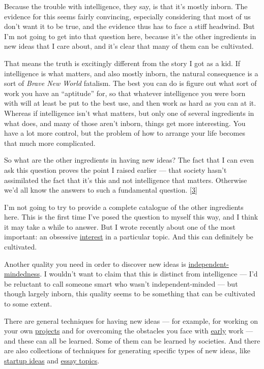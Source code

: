 Because the trouble with intelligence, they say, is that it's mostly
inborn. The evidence for this seems fairly convincing, especially
considering that most of us don't want it to be true, and the evidence
thus has to face a stiff headwind. But I'm not going to get into that
question here, because it's the other ingredients in new ideas that I
care about, and it's clear that many of them can be cultivated.

That means the truth is excitingly different from the story I got as a
kid. If intelligence is what matters, and also mostly inborn, the
natural consequence is a sort of \emph{Brave New World} fatalism. The
best you can do is figure out what sort of work you have an ``aptitude''
for, so that whatever intelligence you were born with will at least be
put to the best use, and then work as hard as you can at it. Whereas if
intelligence isn't what matters, but only one of several ingredients in
what does, and many of those aren't inborn, things get more interesting.
You have a lot more control, but the problem of how to arrange your life
becomes that much more complicated.

So what are the other ingredients in having new ideas? The fact that I
can even ask this question proves the point I raised earlier --- that
society hasn't assimilated the fact that it's this and not intelligence
that matters. Otherwise we'd all know the answers to such a fundamental
question. {[}\hyperref[f3n]{3}{]}

I'm not going to try to provide a complete catalogue of the other
ingredients here. This is the first time I've posed the question to
myself this way, and I think it may take a while to answer. But I wrote
recently about one of the most important: an obsessive
\href{genius.html}{interest} in a particular topic. And this can
definitely be cultivated.

Another quality you need in order to discover new ideas is
\href{think.html}{independent-mindedness}. I wouldn't want to claim that
this is distinct from intelligence --- I'd be reluctant to call someone
smart who wasn't independent-minded --- but though largely inborn, this
quality seems to be something that can be cultivated to some extent.

There are general techniques for having new ideas --- for example, for
working on your own \href{own.html}{projects} and for overcoming the
obstacles you face with \href{early.html}{early} work --- and these can
all be learned. Some of them can be learned by societies. And there are
also collections of techniques for generating specific types of new
ideas, like \href{startupideas.html}{startup ideas} and
\href{essay.html}{essay topics}.

